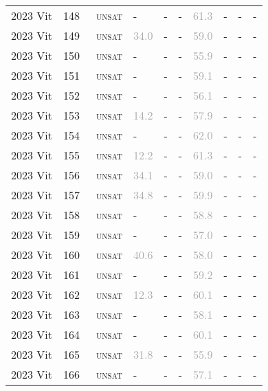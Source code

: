 \begin{center}
{\begin{longtable}{@{}llllllllll@{}}
2023 Vit & 148 & ~\textsc{unsat} & - & - & - & \textcolor{darkgray}{61.3} & - & - & - \\
2023 Vit & 149 & ~\textsc{unsat} & \textcolor{darkgray}{34.0} & - & - & \textcolor{darkgray}{59.0} & - & - & - \\
2023 Vit & 150 & ~\textsc{unsat} & - & - & - & \textcolor{darkgray}{55.9} & - & - & - \\
2023 Vit & 151 & ~\textsc{unsat} & - & - & - & \textcolor{darkgray}{59.1} & - & - & - \\
2023 Vit & 152 & ~\textsc{unsat} & - & - & - & \textcolor{darkgray}{56.1} & - & - & - \\
2023 Vit & 153 & ~\textsc{unsat} & \textcolor{darkgray}{14.2} & - & - & \textcolor{darkgray}{57.9} & - & - & - \\
2023 Vit & 154 & ~\textsc{unsat} & - & - & - & \textcolor{darkgray}{62.0} & - & - & - \\
2023 Vit & 155 & ~\textsc{unsat} & \textcolor{darkgray}{12.2} & - & - & \textcolor{darkgray}{61.3} & - & - & - \\
2023 Vit & 156 & ~\textsc{unsat} & \textcolor{darkgray}{34.1} & - & - & \textcolor{darkgray}{59.0} & - & - & - \\
2023 Vit & 157 & ~\textsc{unsat} & \textcolor{darkgray}{34.8} & - & - & \textcolor{darkgray}{59.9} & - & - & - \\
2023 Vit & 158 & ~\textsc{unsat} & - & - & - & \textcolor{darkgray}{58.8} & - & - & - \\
2023 Vit & 159 & ~\textsc{unsat} & - & - & - & \textcolor{darkgray}{57.0} & - & - & - \\
2023 Vit & 160 & ~\textsc{unsat} & \textcolor{darkgray}{40.6} & - & - & \textcolor{darkgray}{58.0} & - & - & - \\
2023 Vit & 161 & ~\textsc{unsat} & - & - & - & \textcolor{darkgray}{59.2} & - & - & - \\
2023 Vit & 162 & ~\textsc{unsat} & \textcolor{darkgray}{12.3} & - & - & \textcolor{darkgray}{60.1} & - & - & - \\
2023 Vit & 163 & ~\textsc{unsat} & - & - & - & \textcolor{darkgray}{58.1} & - & - & - \\
2023 Vit & 164 & ~\textsc{unsat} & - & - & - & \textcolor{darkgray}{60.1} & - & - & - \\
2023 Vit & 165 & ~\textsc{unsat} & \textcolor{darkgray}{31.8} & - & - & \textcolor{darkgray}{55.9} & - & - & - \\
2023 Vit & 166 & ~\textsc{unsat} & - & - & - & \textcolor{darkgray}{57.1} & - & - & - \\

\end{longtable}}
\end{center}
